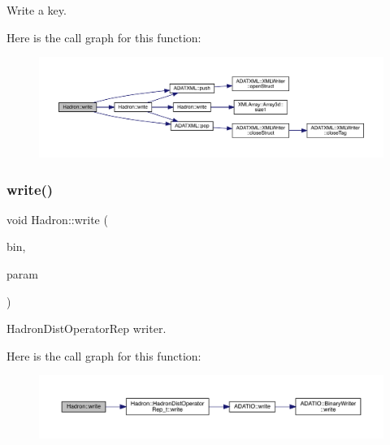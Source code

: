 Write a key. 

Here is the call graph for this function\+:
\nopagebreak
\begin{figure}[H]
\begin{center}
\leavevmode
\includegraphics[width=350pt]{d1/daf/namespaceHadron_aa1f03b8b2d78349da848f9a9bcf19e33_cgraph}
\end{center}
\end{figure}
\mbox{\label{namespaceHadron_a9edaeb80eb507096c7529be211efa667}} 
\subsubsection{\texorpdfstring{write()}{write()}\hspace{0.1cm}{\footnotesize\ttfamily [92/95]}}
{\footnotesize\ttfamily void Hadron\+::write (\begin{DoxyParamCaption}\item[{\mbox{\hyperlink{classADATIO_1_1BinaryWriter}{Binary\+Writer}} \&}]{bin,  }\item[{const \mbox{\hyperlink{classHadron_1_1HadronDistOperatorRep__t}{Hadron\+Dist\+Operator\+Rep\+\_\+t}} \&}]{param }\end{DoxyParamCaption})}



Hadron\+Dist\+Operator\+Rep writer. 

Here is the call graph for this function\+:
\nopagebreak
\begin{figure}[H]
\begin{center}
\leavevmode
\includegraphics[width=350pt]{d1/daf/namespaceHadron_a9edaeb80eb507096c7529be211efa667_cgraph}
\end{center}
\end{figure}
\mbox{\label{namespaceHadron_a2994f8fc2ad609574b948b8671232dd8}} 
